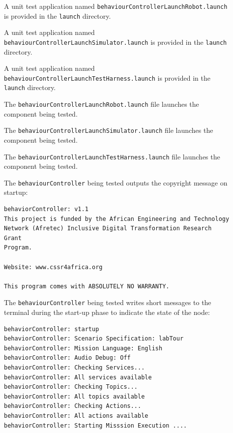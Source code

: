\documentclass{CSSRforAfrica}
\newcommand{\checkboxChecked}{\fbox{\ding{51}}} %
\newcommand{\checkboxDashed}{\fbox{--}}         %
\begin{document}
\begin{description}
\item[\checkboxDashed] A unit test application named {\small \verb+behaviourControllerLaunchRobot.launch+} is provided in the {\small \verb+launch+} directory. 

\item[\checkboxDashed] A unit test application named {\small \verb+behaviourControllerLaunchSimulator.launch+} is provided in the {\small \verb+launch+} directory. 

\item[\checkboxDashed] A unit test application named {\small \verb+behaviourControllerLaunchTestHarness.launch+} is provided in the {\small \verb+launch+} directory. 

\item[\checkboxDashed] The {\small \verb+behaviourControllerLaunchRobot.launch+} file  launches the component being tested.

\item[\checkboxDashed] The {\small \verb+behaviourControllerLaunchSimulator.launch+} file  launches the component being tested.

\item[\checkboxDashed] The {\small \verb+behaviourControllerLaunchTestHarness.launch+} file  launches the component being tested.

\item[\checkboxChecked]  The {\small \verb+behaviourController+} being tested outputs the copyright message on startup:
\begin{verbatim}
behaviorController:	v1.1
This project is funded by the African Engineering and Technology
Network (Afretec) Inclusive Digital Transformation Research Grant
Program.

Website: www.cssr4africa.org

This program comes with ABSOLUTELY NO WARRANTY.
\end{verbatim}

\item[\checkboxChecked]  The {\small \verb+behaviourController+} being tested writes short messages to the terminal during the start-up phase to
 indicate the state of the node:
\begin{verbatim}
behaviorController: startup
behaviorController: Scenario Specification: labTour
behaviorController: Mission Language: English
behaviorController: Audio Debug: Off
behaviorController: Checking Services...
behaviorController: All services available
behaviorController: Checking Topics...
behaviorController: All topics available
behaviorController: Checking Actions...
behaviorController: All actions available
behaviorController: Starting Misssion Execution ....
\end{verbatim}


\end{description}
\end{document}
